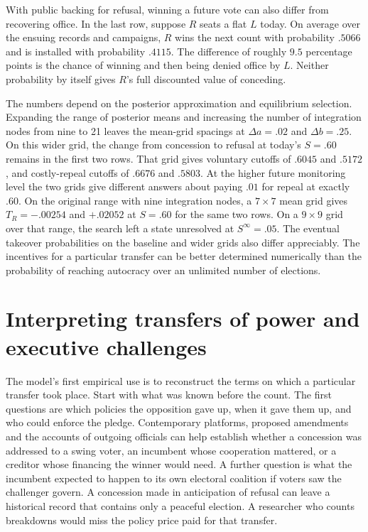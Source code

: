 \documentclass[11pt,letterpaper]{article}
\begin{document}
With public backing for refusal, winning a future vote can also differ from recovering office. In the last row, suppose $R$ seats a flat $L$ today. On average over the ensuing records and campaigns, $R$ wins the next count with probability $.5066$ and is installed with probability $.4115$. The difference of roughly $9.5$ percentage points is the chance of winning and then being denied office by $L$. Neither probability by itself gives $R$'s full discounted value of conceding.

The numbers depend on the posterior approximation and equilibrium selection. Expanding the range of posterior means and increasing the number of integration nodes from nine to 21 leaves the mean-grid spacings at $\Delta a=.02$ and $\Delta b=.25$. On this wider grid, the change from concession to refusal at today's $S=.60$ remains in the first two rows. That grid gives voluntary cutoffs of $.6045$ and $.5172$, and costly-repeal cutoffs of $.6676$ and $.5803$. At the higher future monitoring level the two grids give different answers about paying $.01$ for repeal at exactly $.60$. On the original range with nine integration nodes, a $7\times7$ mean grid gives $T_R=-.00254$ and $+.02052$ at $S=.60$ for the same two rows. On a $9\times9$ grid over that range, the search left a state unresolved at $S^\infty=.05$. The eventual takeover probabilities on the baseline and wider grids also differ appreciably. The incentives for a particular transfer can be better determined numerically than the probability of reaching autocracy over an unlimited number of elections.

\section{Interpreting transfers of power and executive challenges}\label{sec:discussion}

The model's first empirical use is to reconstruct the terms on which a particular transfer took place. Start with what was known before the count. The first questions are which policies the opposition gave up, when it gave them up, and who could enforce the pledge. Contemporary platforms, proposed amendments and the accounts of outgoing officials can help establish whether a concession was addressed to a swing voter, an incumbent whose cooperation mattered, or a creditor whose financing the winner would need. A further question is what the incumbent expected to happen to its own electoral coalition if voters saw the challenger govern. A concession made in anticipation of refusal can leave a historical record that contains only a peaceful election. A researcher who counts breakdowns would miss the policy price paid for that transfer.
\end{document}
